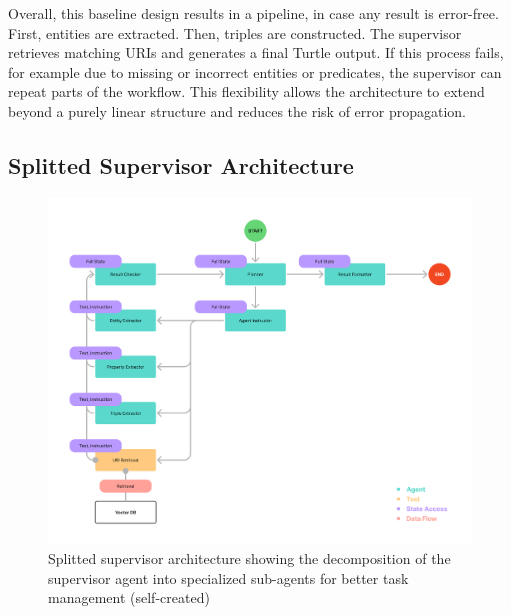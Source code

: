 \documentclass[a4paper,oneside,bibliography=totoc]{scrbook}
\begin{document}
Overall, this baseline design results in a pipeline, in case any result is error-free. First, entities are extracted. Then, triples are constructed. The supervisor retrieves matching URIs and generates a final Turtle output. If this process fails, for example due to missing or incorrect entities or predicates, the supervisor can repeat parts of the workflow. This flexibility allows the architecture to extend beyond a purely linear structure and reduces the risk of error propagation.

\subsection{Splitted Supervisor Architecture}
\label{subsec:supervisor}

\begin{figure}[h]
  \centering
  \includegraphics[width=\textwidth]{figures/Splitted Supervisor Architecture.png}
  \caption[Splitted supervisor architecture showing the decomposition of the supervisor agent into specialized sub-agents for better task management]{Splitted supervisor architecture showing the decomposition of the supervisor agent into specialized sub-agents for better task management (self-created)}
  \label{fig:splitted_supervisor_architecture}
\end{figure}
\end{document}
